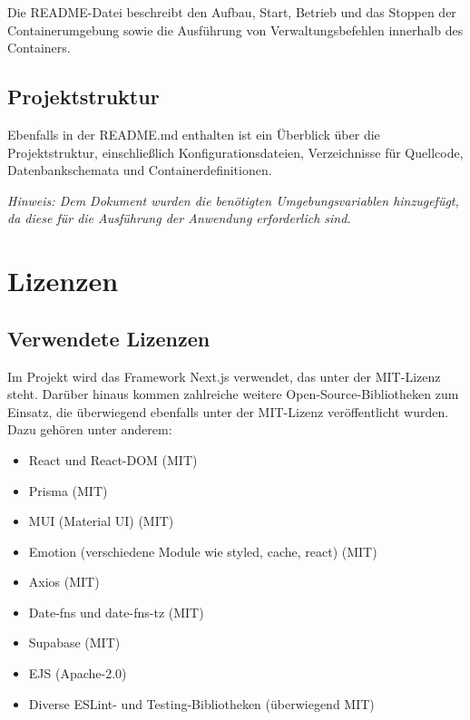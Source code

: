\documentclass[a4paper,12pt]{article}
\begin{document}
Die README-Datei beschreibt den Aufbau, Start, Betrieb und das Stoppen der Containerumgebung sowie die Ausführung von Verwaltungsbefehlen innerhalb des Containers.


\subsection{Projektstruktur}

Ebenfalls in der README.md enthalten ist ein Überblick über die Projektstruktur, einschließlich Konfigurationsdateien, Verzeichnisse für Quellcode, Datenbankschemata und Containerdefinitionen.

\vspace{1em}
\noindent\textit{Hinweis: Dem Dokument wurden die benötigten Umgebungsvariablen hinzugefügt, da diese für die Ausführung der Anwendung erforderlich sind.}

\newpage


\section{Lizenzen}

\subsection{Verwendete Lizenzen}

Im Projekt wird das Framework Next.js verwendet, das unter der MIT-Lizenz steht. Darüber hinaus kommen zahlreiche weitere Open-Source-Bibliotheken zum Einsatz, die überwiegend ebenfalls unter der MIT-Lizenz veröffentlicht wurden. Dazu gehören unter anderem:

\begin{itemize}
  \item React und React-DOM (MIT)
  \item Prisma (MIT)
  \item MUI (Material UI) (MIT)
  \item Emotion (verschiedene Module wie styled, cache, react) (MIT)
  \item Axios (MIT)
  \item Date-fns und date-fns-tz (MIT)
  \item Supabase (MIT)
  \item EJS (Apache-2.0)
  \item Diverse ESLint- und Testing-Bibliotheken (überwiegend MIT)
\end{itemize}
\end{document}
